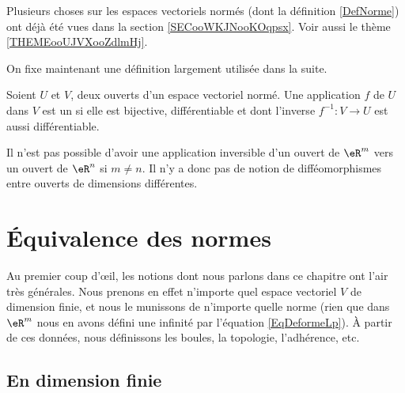 
Plusieurs choses sur les espaces vectoriels normés (dont la définition \ref{DefNorme}) ont déjà été vues dans la section \ref{SECooWKJNooKOqpsx}. Voir aussi le thème \ref{THEMEooUJVXooZdlmHj}.

On fixe maintenant une définition largement utilisée dans la suite.
\begin{definition}      \label{DefAQIQooYqZdya}
	 Soient $U$ et $V$, deux ouverts d'un espace vectoriel normé. Une application $f$ de $U$ dans $V$ est un  si elle est bijective, différentiable et dont l'inverse $f^{-1}:V\to U $ est aussi différentiable.
\end{definition}

\begin{remark}
	Il n'est pas possible d'avoir une application inversible d'un ouvert de $\eR^m$ vers un ouvert de $\eR^n$ si $m\neq n$. Il n'y a donc pas de notion de difféomorphismes entre ouverts de dimensions différentes.
\end{remark}

\section{Équivalence des normes}
\label{normes_equiv}

Au premier coup d'œil, les notions dont nous parlons dans ce chapitre ont l'air très générales. Nous prenons en effet n'importe quel espace vectoriel $V$ de dimension finie, et nous le munissons de n'importe quelle norme (rien que dans $\eR^m$ nous en avons défini une infinité par l'équation \eqref{EqDeformeLp}). À partir de ces données, nous définissons les boules, la topologie, l'adhérence, etc.

\subsection{En dimension finie}

